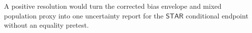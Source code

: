 A positive resolution would turn the corrected bias envelope and mixed population proxy into one uncertainty report for the \(\mathsf{STAR}\) conditional endpoint without an equality pretest.